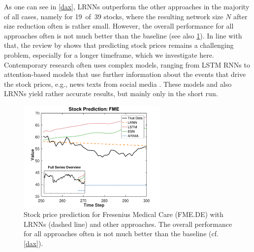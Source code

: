 \documentclass[preprint,12pt,times,authoryear]{elsarticle}%
\theoremstyle{definition}
\begin{document}
As one can see in \cref{dax}, LRNNs outperform the other approaches in the
majority of all cases, namely for 19~of~39 stocks, where the resulting network
size $N$ after size reduction often is rather small. However, the overall
performance for all approaches often is not much better than the baseline (see
also \cref{stockfig}). In line with that, the review by \citet{SIZ19} shows that
predicting stock prices remains a challenging problem, especially for a longer
timeframe, which we investigate
here. Contemporary research often uses complex models, ranging from LSTM RNNs
\citep{NPO17,RPV17} to attention-based models that use further information about
the events that drive the stock prices, e.g., news texts from social media
\citep{LL+19}. These models and also LRNNs yield rather accurate results, but mainly
only in the short run.

\begin{figure}
  \centering
  \includegraphics[width=0.65\textwidth]{fig/stock_prediction_fme}
  \caption{Stock price prediction for Fresenius Medical Care (FME.DE) with LRNNs
	(dashed line) and other approaches. The overall performance for all
	approaches often is not much better than the baseline (cf. \cref{dax}).}
  \label{stockfig}
\end{figure}
\end{document}
